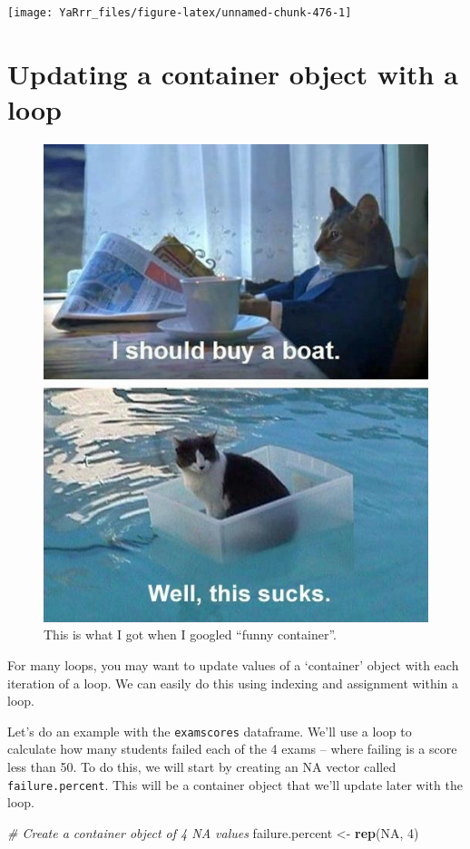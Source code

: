 \documentclass[]{book}
\newenvironment{Shaded}{\begin{snugshade}}{\end{snugshade}}
\newcommand{\KeywordTok}[1]{\textcolor[rgb]{0.13,0.29,0.53}{\textbf{#1}}}
\newcommand{\DecValTok}[1]{\textcolor[rgb]{0.00,0.00,0.81}{#1}}
\newcommand{\StringTok}[1]{\textcolor[rgb]{0.31,0.60,0.02}{#1}}
\newcommand{\CommentTok}[1]{\textcolor[rgb]{0.56,0.35,0.01}{\textit{#1}}}
\newcommand{\OtherTok}[1]{\textcolor[rgb]{0.56,0.35,0.01}{#1}}
\newcommand{\NormalTok}[1]{#1}
\theoremstyle{definition}
\theoremstyle{definition}
\theoremstyle{remark}
\begin{document}
\begin{center}\texttt{[image: YaRrr\_files/figure-latex/unnamed-chunk-476-1]} \end{center}

\section{Updating a container object with a
loop}\label{updating-a-container-object-with-a-loop}

\begin{figure}

{\centering \includegraphics[width=0.6\linewidth]{images/catboat} 

}

\caption{This is what I got when I googled ``funny container''.}\label{fig:unnamed-chunk-477}
\end{figure}

For many loops, you may want to update values of a `container' object
with each iteration of a loop. We can easily do this using indexing and
assignment within a loop.

Let's do an example with the \texttt{examscores} dataframe. We'll use a
loop to calculate how many students failed each of the 4 exams -- where
failing is a score less than 50. To do this, we will start by creating
an NA vector called \texttt{failure.percent}. This will be a container
object that we'll update later with the loop.

\begin{Shaded}
\begin{Highlighting}[]
\CommentTok{# Create a container object of 4 NA values}
\NormalTok{failure.percent <-}\StringTok{ }\KeywordTok{rep}\NormalTok{(}\OtherTok{NA}\NormalTok{, }\DecValTok{4}\NormalTok{)}
\end{Highlighting}
\end{Shaded}
\end{document}
